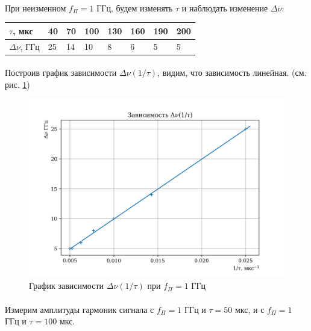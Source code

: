 \documentclass[a4paper,12pt]{article} %
\begin{document}
\paragraph{} При неизменном $f_\Pi = 1$ ГГц, будем изменять $\tau$ и наблюдать изменение $\Delta \nu$:

\begin{table}[h]
\begin{center}
\begin{tabularx}{\textwidth}{|l|Y|Y|Y|Y|Y|Y|Y|}
\hline
$\tau$, мкс & 40 & 70 & 100 & 130 & 160 & 190 & 200 \\ \hline
$\Delta \nu$, ГГц & 25 & 14 & 10 & 8 & 6 & 5 & 5 \\ \hline
\end{tabularx}
\end{center}
\end{table}

\paragraph{} Построив график зависимости $\Delta \nu (1/\tau)$, видим, что зависимость линейная. (см. рис. \ref{fig:plot1})

\begin{figure}
\begin{center}
\includegraphics[width=6in]{plot1.png}
\caption{График зависимости $\Delta \nu (1/\tau)$ при $f_\Pi = 1$ ГГц}
\label{fig:plot1}
\end{center}
\end{figure}

\paragraph{} Измерим амплитуды гармоник сигнала с $f_\Pi = 1$ ГГц и $\tau = 50$ мкс, и с $f_\Pi = 1$ ГГц и $\tau = 100$ мкс.
\end{document}
